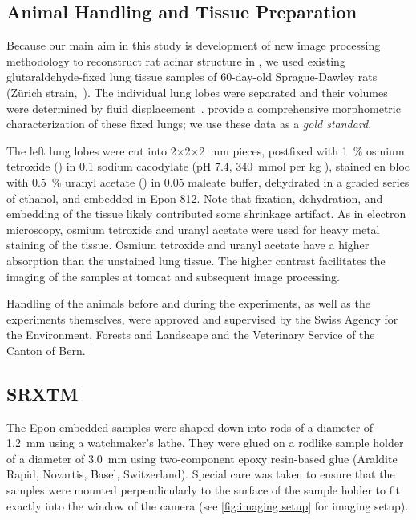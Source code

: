 \subsection[Animal Handling]{Animal Handling and Tissue Preparation}
Because our main aim in this study is development of new image processing methodology to reconstruct rat acinar structure in \threed, we used existing glutaraldehyde-fixed lung tissue samples of 60-day-old Sprague-Dawley rats (Zürich strain,~\cite{Tschanz2003}). The individual lung lobes were separated and their volumes were determined by fluid displacement~\cite{Scherle1970}. \citet{Tschanz2003} provide a comprehensive morphometric characterization of these fixed lungs; we use these data as a \emph{gold standard}.

The left lung lobes were cut into 2$\times$2$\times$\SI{2}{\milli\meter} pieces, postfixed with \SI{1}{\percent} osmium tetroxide () in \SI{0.1}{\Molar} sodium cacodylate (pH 7.4, \SI{340}{\mmol} per \si{\kilogram} ), stained en bloc with \SI{0.5}{\percent} uranyl acetate () in \SI{0.05}{\Molar} maleate buffer, dehydrated in a graded series of ethanol, and embedded in Epon 812. Note that fixation, dehydration, and embedding of the tissue likely contributed some shrinkage artifact. As in electron microscopy, osmium tetroxide and uranyl acetate were used for heavy metal staining of the tissue. Osmium tetroxide and uranyl acetate have a higher absorption than the unstained lung tissue. The higher contrast facilitates the imaging of the samples at \ac{tomcat} and subsequent image processing.

Handling of the animals before and during the experiments, as well as the experiments themselves, were approved and supervised by the Swiss Agency for the Environment, Forests and Landscape and the Veterinary Service of the Canton of Bern.

\subsection{SRXTM}
The Epon embedded samples were shaped down into rods of a diameter of \SI{1.2}{\milli\meter} using a watchmaker's lathe. They were glued on a rodlike sample holder of a diameter of \SI{3.0}{\milli\meter} using two-component epoxy resin-based glue (Araldite Rapid, Novartis, Basel, Switzerland). Special care was taken to ensure that the samples were mounted perpendicularly to the surface of the sample holder to fit exactly into the window of the camera (see \autoref{fig:imaging setup} for imaging setup).

